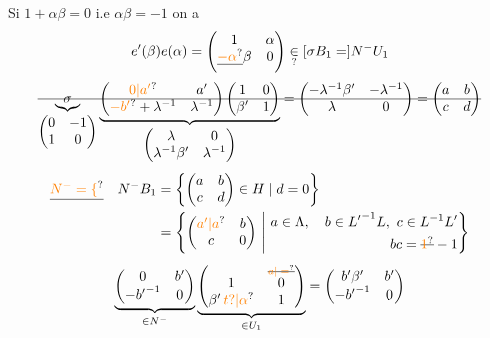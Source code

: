 Si $1+\alpha\beta=0$ i.e $\alpha\beta=-1$ on a
\[e'(\beta)e(\alpha)=\begin{pmatrix}1&\alpha\\\deleted{\unsure{-\alpha}}\beta&0\end{pmatrix}\underset{?}{\in}[\sigma B_1=]N^-U_1\]
\[\deleted{\underbrace{\sigma}_{\begin{pmatrix}0&-1\\1&0\end{pmatrix}}\underbrace{\begin{pmatrix}\unsure{0|a'}&a'\\\unsure{-b'}+\lambda^{-1}&\lambda^{-1}\end{pmatrix}\begin{pmatrix}1&0\\\beta'&1\end{pmatrix}}_{\begin{pmatrix}\lambda&0\\\lambda^{-1}\beta'&\lambda^{-1}\end{pmatrix}}=\begin{pmatrix}-\lambda^{-1}\beta'&-\lambda^{-1}\\\lambda&0\end{pmatrix}=\begin{pmatrix}a&b\\c&d\end{pmatrix}}\]
\[\begin{aligned}
\deleted{\unsure{N^-=\{}}\quad N^-B_1&=\left\{\begin{pmatrix}a&b\\c&d\end{pmatrix}\in H\mid d=0\right\}\\
&=\left\{\begin{pmatrix}\unsure{a'|a}&b\\c&0\end{pmatrix}\ \middle|\ \begin{aligned}a\in\Lambda,\quad b\in{L'}^{-1}L,\ c\in L^{-1}L'\\bc=\deleted{\unsure{1}}-1\end{aligned}\right\}
\end{aligned}\]
\[\underbrace{\begin{pmatrix}0&b'\\-{b'}^{-1}&0\end{pmatrix}}_{\in N^-}\underbrace{\begin{pmatrix}1&\overset{\deleted{\unsure{a|=}}}{0}\\\beta'\,\unsure{t?|\alpha}&1\end{pmatrix}}_{\in U_1}=\begin{pmatrix}b'\beta'&b'\\-{b'}^{-1}&0\end{pmatrix}\]
